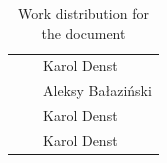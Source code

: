 \begin{table}[!htb]
\begin{tabular}{|l|l|l|}
        \nameref{ch:user_manual}              &                                             & Karol Denst       \\
        \nameref{ch:results}                  &                                             & Aleksy Bałaziński \\
        \nameref{ch:problems}                 &                                             & Karol Denst       \\
        \nameref{ch:improvements}             &                                             & Karol Denst       \\
        \hline
    \end{tabular}
    \caption{Work distribution for the document}
    \label{tab:division_of_work_on_the_document}
\end{table}